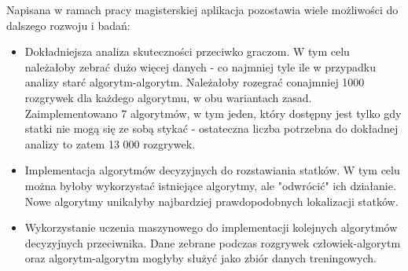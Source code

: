 Napisana w ramach pracy magisterskiej aplikacja pozostawia wiele możliwości do dalszego rozwoju i badań:
\begin{itemize}
    \item Dokładniejsza analiza skuteczności przeciwko graczom. W tym celu należałoby zebrać dużo więcej danych - co najmniej tyle ile w przypadku analizy starć algorytm-algorytm. Należałoby rozegrać conajmniej 1000 rozgrywek dla każdego algorytmu, w obu wariantach zasad. Zaimplementowano 7 algorytmów, w tym jeden, który dostępny jest tylko gdy statki nie mogą się ze sobą stykać - ostateczna liczba potrzebna do dokładnej analizy to zatem 13 000 rozgrywek.
    \item Implementacja algorytmów decyzyjnych do rozstawiania statków. W tym celu można byłoby wykorzystać istniejące algorytmy, ale "odwrócić" ich działanie. Nowe algorytmy unikałyby najbardziej prawdopodobnych lokalizacji statków.
    \item Wykorzystanie uczenia maszynowego do implementacji kolejnych algorytmów decyzyjnych przeciwnika. Dane zebrane podczas rozgrywek człowiek-algorytm oraz algorytm-algorytm mogłyby służyć jako zbiór danych treningowych. 
\end{itemize}
